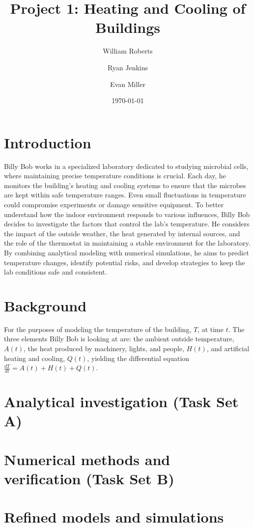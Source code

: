 \documentclass[12pt]{article}
\title{Project 1: Heating and Cooling of Buildings}
\author{William Roberts \and Ryan Jenkins \and Evan Miller}
\date{\today}
\begin{document}
\maketitle

\tableofcontents
\clearpage

\section{Introduction}
Billy Bob works in a specialized laboratory dedicated to studying microbial cells, where maintaining precise temperature conditions is crucial. Each day, he monitors the building’s heating and cooling systems to ensure that the microbes are kept within safe temperature ranges. Even small fluctuations in temperature could compromise experiments or damage sensitive equipment. To better understand how the indoor environment responds to various influences, Billy Bob decides to investigate the factors that control the lab's temperature. He considers the impact of the outside weather, the heat generated by internal sources, and the role of the thermostat in maintaining a stable environment for the laboratory. By combining analytical modeling with numerical simulations, he aims to predict temperature changes, identify potential risks, and develop strategies to keep the lab conditions safe and consistent.

\section{Background}
For the purposes of modeling the temperature of the building, $T$, at time $t$. The three elements Billy Bob is looking at are: the ambient outside temperature, $A(t)$, the heat produced by machinery, lights, and people, $H(t)$, and artificial heating and cooling, $Q(t)$, yielding the differential equation $ \frac{dT}{dt} = A(t) + H(t) + Q(t)$.

\section{Analytical investigation (Task Set A)}

\section{Numerical methods and verification (Task Set B)}

\section{Refined models and simulations}
\end{document}
